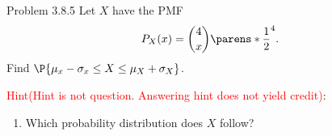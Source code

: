 \begin{problem}{Problem 3.8.5}
    Let $X$ have the PMF \[P_X(x)=\binom{4}{x}\parens*{\frac{1}{2}}^4.\]
    Find $\P{\mu_x-\sigma_x\leq X\leq \mu_X+\sigma_X}$.

    \textcolor{red}{Hint(Hint is not question. Answering hint does not yield credit)}:
    \begin{enumerate}
        \item Which probability distribution does $X$ follow?
    \end{enumerate}
\end{problem}